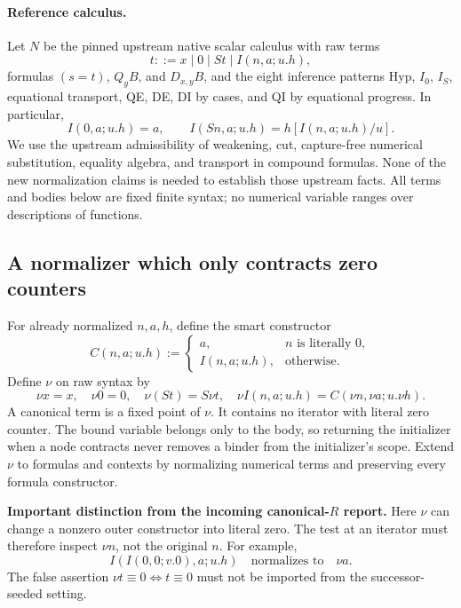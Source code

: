 \documentclass[11pt,a4paper]{article}
\theoremstyle{definition}
\begin{document}
\paragraph{Reference calculus.}
Let $N$ be the pinned upstream native scalar calculus with raw terms
\[
 t::=x\mid 0\mid St\mid I(n,a;u.h),
\]
formulas $(s=t)$, $Q_yB$, and $D_{x,y}B$, and the eight inference patterns
Hyp, $I_0$, $I_S$, equational transport, QE, DE, DI by cases, and QI by
equational progress.  In particular,
\[
 I(0,a;u.h)=a,\qquad
 I(Sn,a;u.h)=h[I(n,a;u.h)/u].
\]
We use the upstream admissibility of weakening, cut, capture-free numerical
substitution, equality algebra, and transport in compound formulas.  None
of the new normalization claims is needed to establish those upstream
facts.  All terms and bodies below are fixed finite syntax; no numerical
variable ranges over descriptions of functions.

\subsection{A normalizer which only contracts zero counters}

For already normalized $n,a,h$, define the smart constructor
\[
 C(n,a;u.h):=
 \begin{cases}
 a,&n\text{ is literally }0,\\
 I(n,a;u.h),&\text{otherwise}.
 \end{cases}
\]
Define $\nu$ on raw syntax by
\[
 \nu x=x,\quad \nu0=0,\quad \nu(St)=S\nu t,\quad
 \nu I(n,a;u.h)=C(\nu n,\nu a;u.\nu h).
\]
A canonical term is a fixed point of $\nu$.  It contains no iterator with
literal zero counter.  The bound variable belongs only to the body, so
returning the initializer when a node contracts never removes a binder
from the initializer's scope.  Extend $\nu$ to formulas and contexts by
normalizing numerical terms and preserving every formula constructor.

\textbf{Important distinction from the incoming canonical-$R$ report.}
Here $\nu$ can change a nonzero outer constructor into literal zero.  The
test at an iterator must therefore inspect $\nu n$, not the original $n$.
For example,
\[
 I(I(0,0;v.0),a;u.h)
 \quad\text{normalizes to}\quad \nu a.
\]
The false assertion $\nu t\equiv0\Longleftrightarrow t\equiv0$ must not be
imported from the successor-seeded setting.
\end{document}
